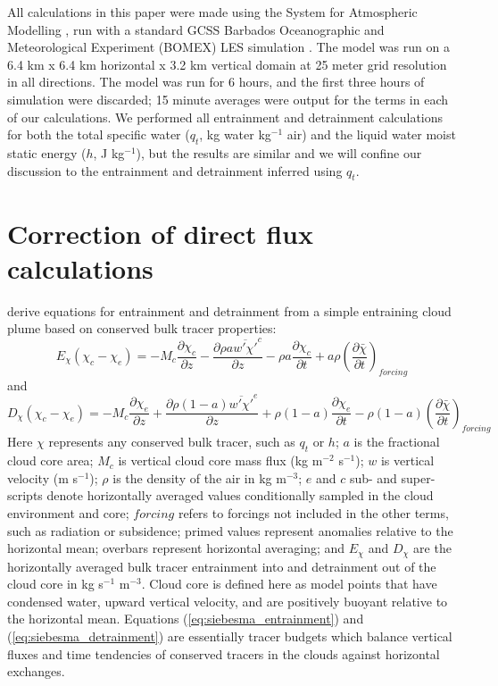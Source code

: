 \documentclass[draft,grl]{agutex}
\begin{document}
\begin{article}
All calculations in this paper were made using the System for Atmospheric 
Modelling \citep[SAM;][]{Khairoutdinov2003}, run with a standard GCSS Barbados 
Oceanographic and Meteorological Experiment (BOMEX) LES simulation 
\citep{Holland1973, Siebesma2003}.  The model was run on a 6.4 km x 6.4 km 
horizontal x 3.2 km vertical domain at 25 meter grid resolution in all 
directions.  The model was run for 6 hours, and the first three hours 
of simulation were discarded; 15 minute averages were output for the terms 
in each of our calculations.  We performed all entrainment and detrainment 
calculations for both the total specific water ($q_t$, kg water kg$^{-1}$ air) 
and the liquid water moist static energy ($h$, J kg$^{-1}$), but the results 
are similar and we will confine our discussion to the entrainment and 
detrainment inferred using $q_t$.

\section{Correction of direct flux calculations}

\cite{Siebesma1995} derive equations for entrainment and detrainment from a 
simple entraining cloud plume based on conserved bulk tracer properties:
\begin{equation}
  \label{eq:siebesma_entrainment}
    E_{\chi}(\chi_c - \chi_e) = - M_c \frac{\partial \chi_c}{\partial z}
        - \frac{\partial \rho a \overline{w' \chi'}^c}{\partial z}
        - \rho a \frac{\partial \chi_c}{\partial t}
        + a \rho \left(\frac{\partial \bar{\chi}}{\partial t}\right)_{forcing}
\end{equation}
and
\begin{equation}
  \label{eq:siebesma_detrainment}
    D_{\chi}(\chi_c - \chi_e) = - M_c \frac{\partial \chi_e}{\partial z}
        + \frac{\partial \rho (1 - a) \overline{w' \chi'}^e}{\partial z}
        + \rho (1-a) \frac{\partial \chi_e}{\partial t}
     - \rho (1-a) \left(\frac{\partial \bar{\chi}}{\partial t}\right)_{forcing}
\end{equation}
Here $\chi$ represents any conserved bulk tracer, such as $q_t$ or $h$; $a$ is 
the fractional cloud core area; $M_c$ is vertical cloud core mass flux 
(kg m$^{-2}$ s$^{-1}$); $w$ is vertical velocity (m s$^{-1}$); $\rho$ is the 
density of the air in kg m$^{-3}$; $e$ and $c$ sub- and super-scripts denote 
horizontally averaged values conditionally sampled in the cloud environment and 
core; $forcing$ refers to forcings not included in the other terms, such as 
radiation or subsidence; primed values represent anomalies relative to the 
horizontal mean; overbars represent horizontal averaging; and $E_{\chi}$ and 
$D_{\chi}$ are the horizontally averaged bulk tracer entrainment into and 
detrainment out of the cloud core in kg s$^{-1}$ m$^{-3}$.  Cloud core is 
defined here as model points that have condensed water, upward vertical 
velocity, and are positively buoyant relative to the horizontal mean.  
Equations (\ref{eq:siebesma_entrainment}) and (\ref{eq:siebesma_detrainment}) 
are essentially tracer budgets which balance vertical fluxes and time 
tendencies of conserved tracers in the clouds against horizontal exchanges.


\end{article}
\end{document}
